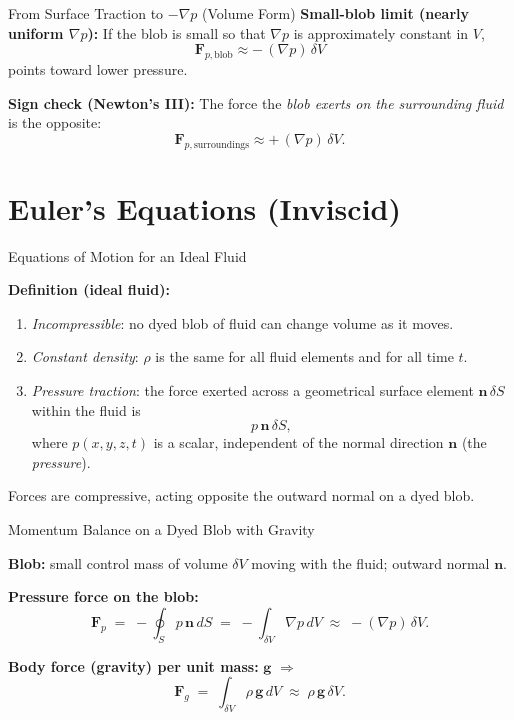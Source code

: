 \documentclass[aspectratio=169]{beamer}
\begin{document}
\begin{frame}{From Surface Traction to $-\nabla p$ (Volume Form)}
\textbf{Small-blob limit (nearly uniform $\nabla p$):}
If the blob is small so that $\nabla p$ is approximately constant in $V$,
\[
\boxed{\;\bm{F}_{p,\text{blob}} \approx -\,(\nabla p)\,\delta V\;}
\]
points toward lower pressure.

\vspace{0.35cm}

\textbf{Sign check (Newton’s III):}
The force the \emph{blob exerts on the surrounding fluid} is the opposite:
\[
\bm{F}_{p,\text{surroundings}} \approx +\,(\nabla p)\,\delta V.
\]
\end{frame}


\section{Euler’s Equations (Inviscid)}

\begin{frame}{Equations of Motion for an Ideal Fluid}

\textbf{Definition (ideal fluid):}
\begin{enumerate}
  \item[(i)] \textit{Incompressible}: no dyed blob of fluid can change volume as it moves.
  \item[(ii)] \textit{Constant density}: $\rho$ is the same for all fluid elements and for all time $t$.
  \item[(iii)] \textit{Pressure traction}: the force exerted across a geometrical surface element
               $\bm{n}\,\delta S$ within the fluid is
               \[
                 p\,\bm{n}\,\delta S,
               \]
               where $p(x,y,z,t)$ is a scalar, independent of the normal direction $\bm{n}$ (the \emph{pressure}).
\end{enumerate}

\medskip
Forces are compressive, acting opposite the outward normal on a dyed blob.

\end{frame}

\begin{frame}{Momentum Balance on a Dyed Blob with Gravity}

\textbf{Blob:} small control mass of volume $\delta V$ moving with the fluid; outward normal $\bm{n}$.

\medskip
\textbf{Pressure force on the blob:}
\[
\bm{F}_p \;=\; -\oint_S p\,\bm{n}\,dS \;=\; -\int_{\delta V} \nabla p\,dV \;\approx\; -(\nabla p)\,\delta V.
\]

\textbf{Body force (gravity) per unit mass:} $\bm{g}$ \quad $\Rightarrow$ \quad
\[
\bm{F}_g \;=\; \int_{\delta V} \rho\,\bm{g}\,dV \;\approx\; \rho\,\bm{g}\,\delta V.
\]
\end{frame}
\end{document}
